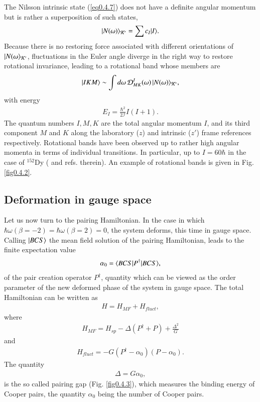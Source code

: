 The Nilsson intrinsic state (\ref{eq0.4.7}) does not have a definite angular momentum but is rather a superposition of such states,
\begin{align}\label{eq0.4.11}
|{N(\omega)} \rangle_{\mathcal K'}=\sum c_I|{I} \rangle.
\end{align}
Because there is no restoring force associated with different orientations of $|{N(\omega} \rangle_{\mathcal K'}$, fluctuations in the Euler angle diverge in the right way to restore rotational invariance, leading to a rotational band whose members are 
\begin{align}\label{eq0.1.47}
|{IKM} \rangle\sim\int d\omega \,\mathcal D^I_{MK}(\omega)\,|{N(\omega)} \rangle_{\mathcal K'},
\end{align}
with energy
\begin{align}\label{eq0.1.48}
E_I=\frac{\hbar^2}{2\mathcal I}I(I+1).
\end{align}
The quantum numbers $I,M,K$ are the total angular momentum $I$, and its third component $M$ and $K$ along the laboratory ($z$) and intrinsic ($z'$) frame references respectively.
Rotational bands have been observed up to rather high angular momenta in terms of individual transitions. In particular, up to $I=60\hbar$ in the case of $^{152}$Dy (\cite{Nolan:88} and refs. therein). An example of rotational bands  is given in Fig. \ref{fig0.4.2}. 
\subsection{Deformation in gauge space}
Let us now turn to the pairing Hamiltonian. In the case in which \mbox{$\hbar\omega(\beta=-2)=\hbar\omega(\beta=2)=0$}, the system deforms, this time in gauge space. Calling $|{BCS} \rangle$ the  mean field solution of the pairing Hamiltonian, leads to the finite expectation value
\begin{align}\label{eq0.4.14}
\alpha_0=\langle {BCS|P^\dagger|BCS} \rangle,
 \end{align}
   of the pair creation operator $P^\dagger$, quantity which can be viewed as the order parameter of the new deformed  phase of the system in gauge space. The total Hamiltonian can be written as
\begin{align}\label{eq0.1.50}
H=H_{MF}+H_{fluct},
\end{align}
where 
\begin{align}\label{eq0.1.51}
H_{MF}=H_{sp}-\Delta(P^\dagger+P)+\frac{\Delta^2}{G}
\end{align}
and
\begin{align}\label{eq0.1.52}
H_{fluct}=-G(P^\dagger-\alpha_0)(P-\alpha_0).
\end{align}
The quantity 
\begin{align}\label{eq0.1.53}
\Delta=G\alpha_0,
\end{align}
is the so called pairing gap (Fig. \ref{fig0.4.3}), which measures the binding energy of Cooper pairs, the quantity $\alpha_0$ being the number of Cooper pairs.

